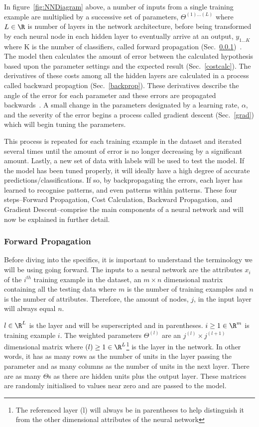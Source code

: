 In figure~\ref{fig:NNDiagram} above, a number of inputs from a single training example are  multiplied by a successive set of parameters, $\Theta^{(1)...(L)}$ where $L \in \R$ is number of layers in the network architecture, before being transformed by each neural node in each hidden layer to eventually arrive at an output, $y_{1...K}$ where K is the number of classifiers, called forward propagation (Sec.~\ref{fprop})~\cite{Ng2011a}. The model then calculates the amount of error between the calculated hypothesis based upon the parameter settings and the expected result (Sec.~\ref{costcalc}). The derivatives of these costs among all the hidden layers are calculated in a process called backward propagtion (Sec.~\ref{backprop}). These derivatives describe the angle of the error for each parameter and these errors are propagated backwards~\cite{Ng2011a}. A small change in the parameters designated by a learning rate, $\alpha$, and the severity of the error begins a process called gradient descent (Sec.~\ref{grad}) which will begin tuning the parameters.

This process is repeated for each training example in the dataset and iterated several times until the amount of error is no longer decreasing by a significant amount. Lastly, a new set of data with labels will be used to test the model. If the model has been tuned properly, it will ideally have a high degree of accurate predictions/classifications. If so, by backpropagating the errors, each layer has learned to recognise patterns, and even patterns within patterns. These four steps--Forward Propagation, Cost Calculation, Backward Propagation, and Gradient Descent--comprise the main components of a neural network and will now be explained in further detail.

\subsubsection{Forward Propagation}\label{fprop}
Before diving into the specifics, it is important to understand the terminology we will be using going forward. The inputs to a neural network are the attributes $x_i$ of the $i^{th}$ training example in the dataset, an $m \times n$ dimensional matrix containing all the testing data where $m$ is the number of training examples and $n$ is the number of attributes. Therefore, the amount of nodes, $j$, in the input layer will always equal $n$.

$l \in \R^L$ is the layer and will be superscripted and in parentheses. $i \ge1 \in \R^m$ is training example $i$. The weighted parameters $\Theta^{(l)}$ are an $j^{(l)} \times j^{(l+1)}$ dimensional matrix where $(l) \ge1 \in \R^L$\footnote{The referenced layer (l) will always be in parentheses to help distinguish it from the other dimensional attributes of the neural network} is the layer in the network. In other words, it has as many rows as the number of units in the layer passing the parameter and as many columns as the number of units in the next layer. There are as many $\Theta$s as there are hidden units plus the output layer. These matrices are randomly initialised to values near zero and are passed to the model.

